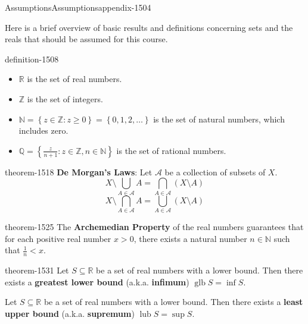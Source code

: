 \documentclass[oneside,10pt,]{article}
\newcommand{\terminology}[1]{\textbf{#1}}
\newcommand{\mb}{\mathbb}
\newcommand{\mc}{\mathcal}
\newcommand{\glb}{\operatorname{glb}}
\newcommand{\lub}{\operatorname{lub}}
\newcommand{\setBuilder}[2]{\left\{#1:#2\right\}}
\newcommand{\setList}[1]{\left\{#1\right\}}
\newcommand{\lt}{<}
\begin{document}
\begin{appendixptx}{Assumptions}{}{Assumptions}{}{}{appendix-1504}
\begin{introduction}{}%
\hypertarget{p-1507}{}%
Here is a brief overview of basic results and definitions concerning sets and the reals that should be assumed for this course.%
\end{introduction}%
\begin{definition}{}{definition-1508}%
\leavevmode%
\begin{itemize}[label=\textbullet]
\item{}\(\mb R\) is the set of real numbers.%
\item{}\(\mb Z\) is the set of integers.%
\item{}\(\mb N=\setBuilder{z\in\mb Z}{z\geq 0}=\setList{0,1,2,\dots}\) is the set of natural numbers, which includes zero.%
\item{}\(\mb Q=\setBuilder{\frac{z}{n+1}}{z\in\mb Z,n\in\mb N}\) is the set of rational numbers.%
\end{itemize}
\end{definition}
\begin{theorem}{}{}{theorem-1518}%
\hypertarget{p-1519}{}%
\terminology{De Morgan's Laws}: Let \(\mc A\) be a collection of subsets of \(X\).%
%
\begin{equation*}
X\setminus\bigcup_{A\in\mc A}A=\bigcap_{A\in\mc A}(X\setminus A)
\end{equation*}
%
\begin{equation*}
X\setminus\bigcap_{A\in\mc A}A=\bigcup_{A\in\mc A}(X\setminus A)
\end{equation*}
\end{theorem}
\begin{theorem}{}{}{theorem-1525}%
\hypertarget{p-1526}{}%
The \terminology{Archemedian Property} of the real numbers guarantees that for each positive real number \(x>0\), there exists a natural number \(n\in\mb N\) such that \(\frac{1}{n}\lt x\).%
\end{theorem}
\begin{theorem}{}{}{theorem-1531}%
\hypertarget{p-1532}{}%
Let \(S\subseteq \mb R\) be a set of real numbers with a lower bound. Then there exists a \terminology{greatest lower bound} (a.k.a. \terminology{infimum}) \(\glb S=\inf S\).%
\par
\hypertarget{p-1537}{}%
Let \(S\subseteq \mb R\) be a set of real numbers with a lower bound. Then there exists a \terminology{least upper bound} (a.k.a. \terminology{supremum}) \(\lub S=\sup S\).%
\end{theorem}
\end{appendixptx}
\end{document}
